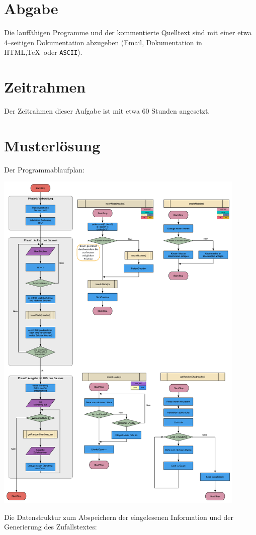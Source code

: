 \documentclass[paper=a4,notitlepage,parskip=half,plainheadsepline]{scrartcl}
\newif\ifloesung
\begin{document}
\section{Abgabe} 
Die lauffähigen Programme und der kommentierte Quelltext sind mit einer etwa 4--seitigen Dokumentation abzugeben (Email, Dokumentation in HTML,\TeX\  oder \texttt{ASCII}). %

\section{Zeitrahmen}
Der Zeitrahmen dieser Aufgabe ist mit etwa 60 Stunden angesetzt.

\ifloesung
\newpage
\section{Musterlösung}
Der Programmablaufplan:

\begin{center}
\includegraphics[width=0.90\textwidth]{Aufgabe02Flowchart}
\end{center}
\newpage
Die Datenstruktur zum Abspeichern der eingelesenen Information und der Generierung des Zufallstextes:
\end{document}
